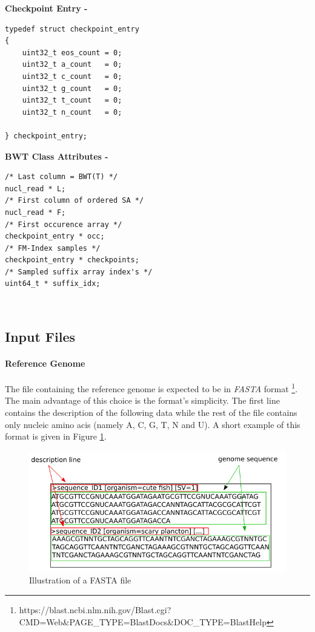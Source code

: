 \begin{minipage}[t]{0.4\textwidth}
	\textbf{Checkpoint Entry -} \\
	\vspace{-5mm}
	\begin{verbatim}   
typedef struct checkpoint_entry
{
    uint32_t eos_count = 0;
    uint32_t a_count   = 0;
    uint32_t c_count   = 0;
    uint32_t g_count   = 0;
    uint32_t t_count   = 0;
    uint32_t n_count   = 0;
	
} checkpoint_entry;
	\end{verbatim}
\end{minipage}
\hspace*{15mm}
\begin{minipage}[t]{0.5\textwidth}
		\textbf{BWT Class Attributes - }
\begin{verbatim}
/* Last column = BWT(T) */
nucl_read * L;
/* First column of ordered SA */
nucl_read * F;	
/* First occurence array */
checkpoint_entry * occ;	
/* FM-Index samples */
checkpoint_entry * checkpoints; 
/* Sampled suffix array index's */
uint64_t * suffix_idx;	

	\end{verbatim}
	\textcolor{white}{.}\\

	
	
\end{minipage}

\subsection{Input Files}

\paragraph{Reference Genome}
The file containing the reference genome is expected to be in \textsl{FASTA} format \footnote{https://blast.ncbi.nlm.nih.gov/Blast.cgi?CMD=Web&PAGE_TYPE=BlastDocs&DOC_TYPE=BlastHelp}. The main advantage of this choice is the format's simplicity. The first line contains the description of the following data while the rest of the file contains only nucleic amino acis (namely A, C, G, T, N and U). A short example of this format is given in Figure \ref{fig:fasta}.

\begin{figure}[H]
    \centering
    \includegraphics[scale = 0.5]{Figures/fastaex.png}
    \caption{Illustration of a FASTA file }
    \label{fig:fasta}
\end{figure}

